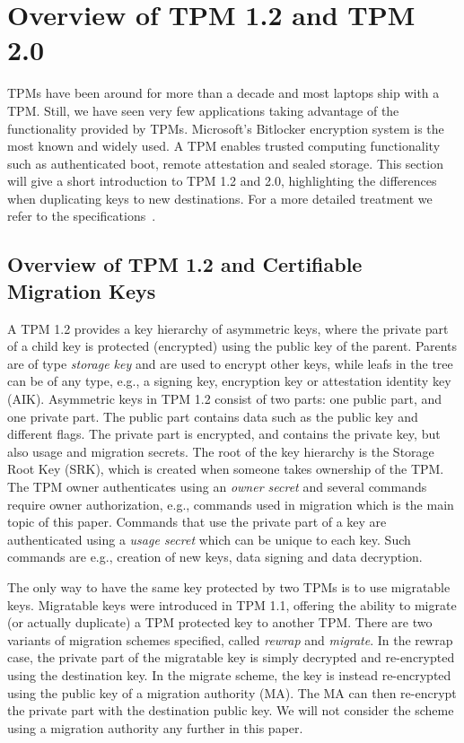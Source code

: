 {\section{Overview of TPM 1.2 and TPM 2.0}
\label{sec:overview}
TPMs have been around for more than a decade and most laptops ship with a TPM. Still, we have seen very few applications taking advantage of the functionality provided by TPMs. Microsoft's Bitlocker encryption system is the most known and widely used. A TPM enables trusted computing functionality such as authenticated boot, remote attestation and sealed storage. This section will give a short introduction to TPM 1.2 and 2.0, highlighting the differences when duplicating keys to new destinations. For a more detailed treatment we refer to the specifications~\cite{TPM1.2spec,TPM2.0r07}.
 
\subsection{Overview of TPM 1.2 and Certifiable Migration Keys}
A TPM 1.2 provides a key hierarchy of asymmetric keys, where the private part of a child key is protected (encrypted) using the public key of the parent. Parents are of type \textit{storage key} and are used to encrypt other keys, while leafs in the tree can be of any type, e.g., a signing key, encryption key or attestation identity key (AIK). Asymmetric keys in TPM 1.2 consist of two parts: one public part, and one private part. The public part contains data such as the public key and different flags. The private part is encrypted, and contains the private key, but also usage and migration secrets. The root of the key hierarchy is the Storage Root Key (SRK), which is created when someone takes ownership of the TPM. The TPM owner authenticates using an \textit{owner secret} and several commands require owner authorization, e.g., commands used in migration which is the main topic of this paper. Commands that use the private part of a key are authenticated using a \textit{usage secret} which can be unique to each key. Such commands are e.g., creation of new keys, data signing and data decryption.
 
The only way to have the same key protected by two TPMs is to use migratable keys. Migratable keys were introduced in TPM 1.1, offering the ability to migrate (or actually duplicate) a TPM protected key to another TPM. There are two variants of migration schemes specified, called \textit{rewrap} and \textit{migrate}. In the rewrap case, the private part of the migratable key is simply decrypted and re-encrypted using the destination key. In the migrate scheme, the key is instead re-encrypted using the public key of a migration authority (MA). The MA can then re-encrypt the private part with the destination public key. We will not consider the scheme using a migration authority any further in this paper.

}
